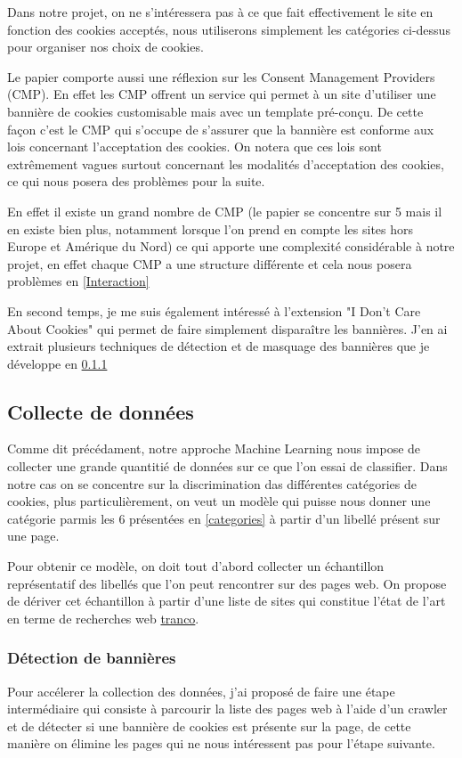 \documentclass[oneside,a4paper,12pt]{article}
\begin{document}
	Dans notre projet, on ne s'intéressera pas à ce que fait effectivement le site en fonction des cookies acceptés, nous utiliserons simplement les catégories ci-dessus pour organiser nos choix de cookies.
	
	Le papier comporte aussi une réflexion sur les Consent Management Providers (CMP). En effet les CMP offrent un service qui permet à un site d'utiliser une bannière de cookies customisable mais avec un template pré-conçu. De cette façon c'est le CMP qui s'occupe de s'assurer que la bannière est conforme aux lois concernant l'acceptation des cookies.
	On notera que ces lois sont extrêmement vagues surtout concernant les modalités d'acceptation des cookies, ce qui nous posera des problèmes pour la suite.
	
	En effet il existe un grand nombre de CMP (le papier \cite{consentomatic} se concentre sur 5 mais il en existe bien plus, notamment lorsque l'on prend en compte les sites hors Europe et Amérique du Nord) ce qui apporte une complexité considérable à notre projet, en effet chaque CMP a une structure différente et cela nous posera problèmes en \ref{Interaction}
	
	En second temps, je me suis également intéressé à l'extension "I Don't Care About Cookies" qui permet de faire simplement disparaître les bannières. J'en ai extrait plusieurs techniques de détection et de masquage des bannières que je développe en \ref{DetectionDeBannieres}
	
	\subsection{Collecte de données}
	\label{collecte}
	Comme dit précédament, notre approche Machine Learning nous impose de collecter une grande quantitié de données sur ce que l'on essai de classifier.
	Dans notre cas on se concentre sur la discrimination das différentes catégories de cookies, plus particulièrement, on veut un modèle qui puisse nous donner une catégorie parmis les 6 présentées en \ref{categories} à partir d'un libellé présent sur une page.
	
	Pour obtenir ce modèle, on doit tout d'abord collecter un échantillon représentatif des libellés que l'on peut rencontrer sur des pages web. On propose de dériver cet échantillon à partir d'une liste de sites qui constitue l'état de l'art en terme de recherches web \href{https://tranco-list.eu/}{tranco}.
	
	\subsubsection{Détection de bannières}
	\label{DetectionDeBannieres}
	Pour accélerer la collection des données, j'ai proposé de faire une étape intermédiaire qui consiste à parcourir la liste des pages web à l'aide d'un crawler et de détecter si une bannière de cookies est présente sur la page, de cette manière on élimine les pages qui ne nous intéressent pas pour l'étape suivante.
	
\end{document}
